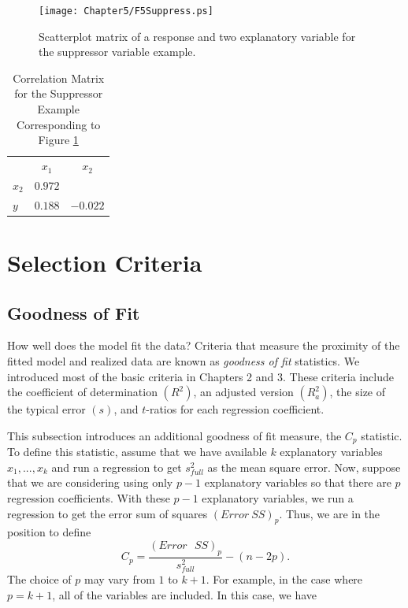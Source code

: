 \begin{figure}[htp]
  \begin{center}
    \texttt{[image: Chapter5/F5Suppress.ps]}
    \caption{\label{F5:Suppress} \small  Scatterplot matrix of a
response and two explanatory variable for the suppressor variable
example.}
  \end{center}
\end{figure}


\begin{table}[h]

\caption{\label{T5:Suppress} Correlation Matrix for the Suppressor
Example Corresponding to Figure \ref{F5:Suppress}}

\begin{tabular}{ccc}
\hline
& $x_1$ & $x_2$ \\
\multicolumn{1}{l}{$x_2$} & $0.972$ &  \\
\multicolumn{1}{l}{$y$} & $0.188$ & $-0.022$ \\ \hline
\end{tabular}
\linetjed {}
\end{table}

\section{Selection Criteria}


\subsection{Goodness of Fit}

How well does the model fit the data? Criteria that measure the
proximity of the fitted model and realized data are known as
\emph{goodness of fit} statistics. We introduced most of the basic
criteria in Chapters 2 and 3. These criteria include the coefficient
of determination $(R^2)$, an adjusted version $(R_{a}^2)$, the size
of the typical error $(s)$, and $t$-ratios for each regression
coefficient.

This subsection introduces an additional goodness of fit measure,
the $C_p$ statistic. To define this statistic, assume that we have
available $k$ explanatory variables $x_1,...,x_{k}$ and run a
regression to get $s_{full}^2$ as the mean square error. Now,
suppose that we are considering using only $p-1$ explanatory
variables so that there are $p$ regression coefficients. With these
$p-1$ explanatory variables, we run a regression to get the error
sum of squares $(Error~SS)_p$. Thus, we are in the position to
define
\begin{equation*}
C_{p}=\frac{(Error\text{ }SS)_p}{s_{full}^2}-(n-2p).
\end{equation*}
The choice of $p$ may vary from $1$ to $k+1$. For example, in the case where
$p=k+1$, all of the variables are included. In this case, we have

